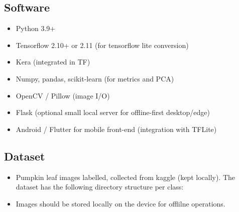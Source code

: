 \subsection{Software}
\begin{itemize}
	\item Python 3.9+
	\item Tensorflow 2.10+ or 2.11 (for tensorflow lite conversion)
	\item Kera (integrated in TF)
	\item Numpy, pandas, scikit-learn (for metrics and PCA)
	\item OpenCV / Pillow (image I/O)
	\item Flask (optional small local server for offline-first desktop/edge)
	\item Android / Flutter for mobile front-end (integration with TFLite)
\end{itemize}

\subsection{Dataset}

\begin{itemize}
	\item Pumpkin leaf images labelled, collected from kaggle (kept locally). The dataset has the following directory structure per class:
\end{itemize}
\begin{itemize}
	\item Images should be stored locally on the device for offlilne operations.
\end{itemize}

